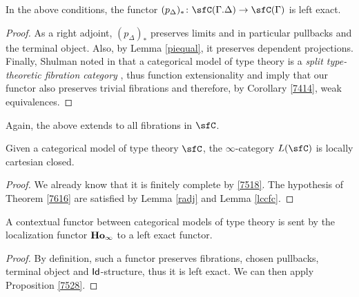 \begin{lem}\label{lccfc}
  In the above conditions, the functor
  $(p_\Delta)_*\colon\sfC(\Gamma.\Delta)\rightarrow\sfC(\Gamma)$ is left exact.
\end{lem}
\begin{proof}
  As a right adjoint, $(p_\Delta)_*$ preserves limits and in particular
  pullbacks and the terminal object. Also, by Lemma \ref{piequal}, it preserves
  dependent projections. Finally, Shulman noted in \cite[21]{Shu14} that a
  categorical model of type theory is a \emph{split type-theoretic fibration
  category} \cite[Def.~4.1]{Shu14}, thus function extensionality and
  \cite[Thm.~5.9]{Shu14} imply that our functor also preserves trivial
  fibrations and therefore, by Corollary \ref{7414}, weak equivalences.
\end{proof}

Again, the above extends to all fibrations in $\sfC$.

\begin{thm}
  Given a categorical model of type theory $\sfC$, the $\infty$-category $L(\sfC)$
  is locally cartesian closed.
\end{thm}
\begin{proof}
  We already know that it is finitely complete by \ref{7518}. The hypothesis of
  Theorem \ref{7616} are satisfied by Lemma \ref{radj} and Lemma \ref{lccfc}.
\end{proof}

\begin{thm}
  A contextual functor between categorical models of type theory is sent by the
  localization functor $\operatorname{\mathbf{Ho}_\infty}$ to a left exact functor.
\end{thm}
\begin{proof}
  By definition, such a functor preserves fibrations, chosen pullbacks, terminal
  object and $\operatorname{\mathsf{Id}}$-structure, thus it is left exact. We can then apply
  Proposition \ref{7528}.
\end{proof}
